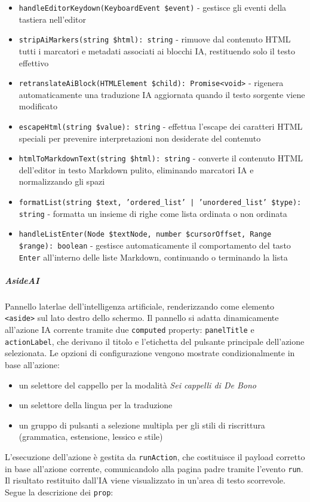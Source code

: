 \documentclass[a4paper,10pt]{article}
\begin{document}
\begin{itemize}
    \item \texttt{handleEditorKeydown(KeyboardEvent \$event)} - gestisce gli eventi della tastiera nell'editor
    \item \texttt{stripAiMarkers(string \$html): string} - rimuove dal contenuto HTML tutti i marcatori e metadati associati ai blocchi IA, restituendo solo il testo effettivo
    \item \texttt{retranslateAiBlock(HTMLElement \$child): Promise<void>} - rigenera automaticamente una traduzione IA aggiornata quando il testo sorgente viene modificato
    \item \texttt{escapeHtml(string \$value): string} - effettua l'escape dei caratteri HTML speciali per prevenire interpretazioni non desiderate del contenuto
    \item \texttt{htmlToMarkdownText(string \$html): string} - converte il contenuto HTML dell'editor in testo Markdown pulito, eliminando marcatori IA e normalizzando gli spazi
    \item \texttt{formatList(string \$text, 'ordered\_list' | 'unordered\_list' \$type): string} - formatta un insieme di righe come lista ordinata o non ordinata
    \item \texttt{handleListEnter(Node \$textNode, number \$cursorOffset, Range \$range): boolean} - gestisce automaticamente il comportamento del tasto \texttt{Enter} all'interno delle liste Markdown, continuando o terminando la lista
\end{itemize}
\subparagraph{AsideAI} Pannello laterlae dell'intelligenza artificiale, renderizzando come elemento \texttt{<aside>} sul lato destro dello schermo. Il pannello si adatta dinamicamente all'azione IA corrente tramite due \texttt{computed} property: \texttt{panelTitle} e \texttt{actionLabel}, che derivano il titolo e l'etichetta del pulsante principale dell'azione selezionata. Le opzioni di configurazione vengono mostrate condizionalmente in base all'azione:
\begin{itemize}
    \item un selettore del cappello per la modalità \textit{Sei cappelli di De Bono}
    \item un selettore della lingua per la traduzione
    \item un gruppo di pulsanti a selezione multipla per gli stili di riscrittura (grammatica, estensione, lessico e stile)
\end{itemize}
L'esecuzione dell'azione è gestita da \texttt{runAction}, che costituisce il payload corretto in base all'azione corrente, comunicandolo alla pagina padre tramite l'evento \texttt{run}. Il risultato restituito dall'IA viene visualizzato in un'area di testo scorrevole. Segue la descrizione dei \texttt{prop}:
\end{document}
